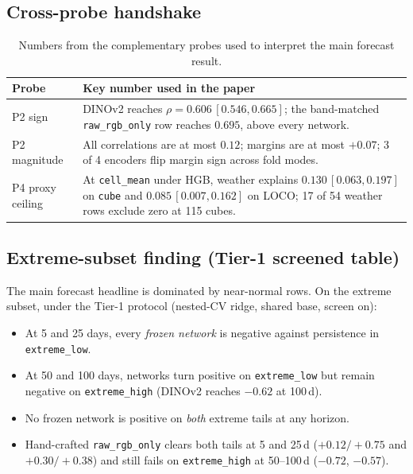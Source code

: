\subsection{Cross-probe handshake}
\begin{table}[h]
\centering
\footnotesize
\begin{tabular}{@{}>{\raggedright\arraybackslash}p{}>{\raggedright\arraybackslash}p{}@{}}
\toprule
Probe & Key number used in the paper \\
\midrule
P2 sign & DINOv2 reaches $\rho=0.606\,[0.546,0.665]$; the band-matched \texttt{raw\_rgb\_only} row reaches $0.695$, above every network. \\
P2 magnitude & All correlations are at most $0.12$; margins are at most $+0.07$; 3 of 4 encoders flip margin sign across fold modes. \\
P4 proxy ceiling & At \texttt{cell\_mean} under HGB, weather explains $0.130\,[0.063,0.197]$ on \texttt{cube} and $0.085\,[0.007,0.162]$ on LOCO; 17 of 54 weather rows exclude zero at 115 cubes. \\
\bottomrule
\end{tabular}
\caption{Numbers from the complementary probes used to interpret the main forecast result.}
\label{tab:handshake}
\end{table}

\subsection{Extreme-subset finding (Tier-1 screened table)}
The main forecast headline is dominated by near-normal rows. On the extreme
subset, under the Tier-1 protocol (nested-CV ridge, shared base, screen on):
\begin{itemize}
\item At 5 and 25 days, every \emph{frozen network} is negative against
persistence in \texttt{extreme\_low}.
\item At 50 and 100 days, networks turn positive on \texttt{extreme\_low} but
remain negative on \texttt{extreme\_high} (DINOv2 reaches $-0.62$ at 100\,d).
\item No frozen network is positive on \emph{both} extreme tails at any horizon.
\item Hand-crafted \texttt{raw\_rgb\_only} clears both tails at 5 and 25\,d
($+0.12/+0.75$ and $+0.30/+0.38$) and still fails on \texttt{extreme\_high} at
50--100\,d ($-0.72$, $-0.57$).
\end{itemize}

